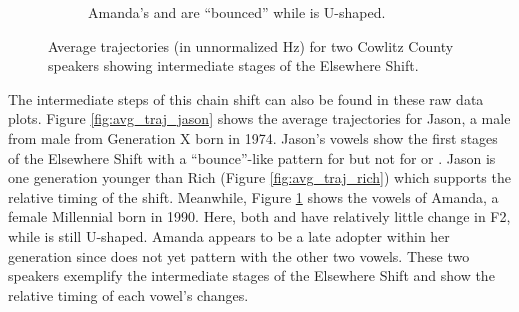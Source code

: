 \begin{figure}[tb!]
\begin{subfigure}[t]{2.925in}
        \caption{Amanda's \bat and \bet are ``bounced'' while \bit is U-shaped.}
        \label{fig:avg_traj_amanda}
    \end{subfigure}
    \hspace{\fill}
    \caption{Average trajectories (in unnormalized Hz) for two Cowlitz County speakers showing intermediate stages of the Elsewhere Shift.}
    \label{fig:jason_and_amanda}
\end{figure}

The intermediate steps of this chain shift can also be found in these raw data plots. Figure \ref{fig:avg_traj_jason} shows the average trajectories for Jason, a male from male from Generation X born in 1974. Jason's vowels show the first stages of the Elsewhere Shift with a ``bounce''-like pattern for \bat but not for \bet or \bit. Jason is one generation younger than Rich (Figure \ref{fig:avg_traj_rich}) which supports the relative timing of the shift. Meanwhile, Figure \ref{fig:avg_traj_amanda} shows the vowels of Amanda, a female Millennial born in 1990. Here, both \bat and \bet have relatively little change in F2, while \bit is still U-shaped. Amanda appears to be a late adopter within her generation since \bit does not yet pattern with the other two vowels. These two speakers exemplify the intermediate stages of the Elsewhere Shift and show the relative timing of each vowel's changes.

